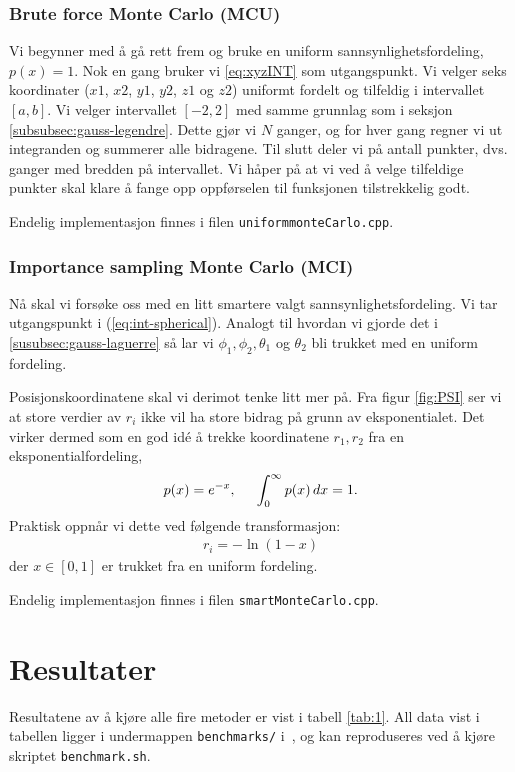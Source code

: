 \documentclass[11pt]{article}
\begin{document}
\subsubsection{Brute force Monte Carlo (MCU)}
\label{subsubsec:monte-carlo-uniform}
Vi begynner med å gå rett frem og bruke en uniform
sannsynlighetsfordeling, $p(x) = 1$. Nok en gang bruker vi
\eqref{eq:xyzINT} som utgangspunkt. Vi velger seks koordinater ($x1$,
$x2$, $y1$, $y2$, $z1$ og $z2$) uniformt fordelt og tilfeldig i
intervallet $[a,b]$. Vi velger intervallet $[-2,2]$ med samme grunnlag
som i seksjon \ref{subsubsec:gauss-legendre}. Dette gjør vi $N$ ganger, og for hver gang regner
vi ut integranden og summerer alle bidragene. Til slutt deler vi på
antall punkter, dvs. ganger med bredden på intervallet. Vi håper på
at vi ved å velge tilfeldige punkter skal klare å fange opp
oppførselen til funksjonen tilstrekkelig godt.

Endelig implementasjon finnes i filen \texttt{uniformmonteCarlo.cpp}.

\subsubsection{Importance sampling Monte Carlo (MCI)}
\label{susubsec:monte-carlo-importance-sampling}
Nå skal vi forsøke oss med en litt smartere valgt
sannsynlighetsfordeling. Vi tar utgangspunkt i
(\ref{eq:int-spherical}). Analogt til hvordan vi gjorde det i
\ref{susubsec:gauss-laguerre} så lar vi $\phi_1,\phi_2,\theta_1$ og
$\theta_2$ bli trukket med en uniform fordeling.

Posisjonskoordinatene skal vi derimot tenke litt mer på. Fra figur
\ref{fig:PSI} ser vi at store verdier av $r_i$ ikke vil ha store
bidrag på grunn av eksponentialet. Det virker dermed som en god idé å
trekke koordinatene $r_1,r_2$ fra en eksponentialfordeling,
\begin{align}
  p(x) = e^{-x},\hspace{0.5cm}\int_0^\infty p(x)\,dx=1.\label{eq:exponential-prob}
\end{align}
Praktisk oppnår vi dette ved følgende transformasjon:
\begin{align}
  r_i = -\ln \left( 1-x \right)
\end{align}
der $x\in[0,1]$ er trukket fra en uniform fordeling.

Endelig implementasjon finnes i filen \texttt{smartMonteCarlo.cpp}.

\section{Resultater}
Resultatene av å kjøre alle fire metoder er vist i tabell
\ref{tab:1}. All data vist i tabellen ligger i undermappen
\texttt{benchmarks/} i~\cite{github-repo}, og kan reproduseres ved å
kjøre skriptet \texttt{benchmark.sh}. 
\end{document}
